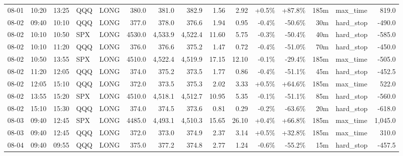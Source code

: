 \documentclass[11pt,a4paper,twoside]{article}
\begin{document}
\begin{landscape}
\begin{center}
\begin{longtable}{>{\color{txtmain}}l l l l l r r r r r r r r >{\color{txtmain}}l r}
08-01 & 10:20 & 13:25 & QQQ & LONG & 380.0 & 381.0 & 382.9 & 1.56 & 2.92 & \textcolor{wingreen}{+0.5\%} & \textcolor{wingreen}{+87.8\%} & 185m & max\_time & \textcolor{wingreen}{819.0} \\
08-02 & 09:40 & 10:10 & QQQ & LONG & 377.0 & 378.0 & 376.6 & 1.94 & 0.95 & \textcolor{lossred}{-0.4\%} & \textcolor{lossred}{-50.6\%} & 30m & hard\_stop & \textcolor{lossred}{-490.0} \\
08-02 & 10:10 & 10:50 & SPX & LONG & 4530.0 & 4,533.9 & 4,522.4 & 11.60 & 5.75 & \textcolor{lossred}{-0.3\%} & \textcolor{lossred}{-50.4\%} & 40m & hard\_stop & \textcolor{lossred}{-585.0} \\
08-02 & 10:10 & 11:20 & QQQ & LONG & 376.0 & 376.6 & 375.2 & 1.47 & 0.72 & \textcolor{lossred}{-0.4\%} & \textcolor{lossred}{-51.0\%} & 70m & hard\_stop & \textcolor{lossred}{-450.0} \\
08-02 & 10:50 & 13:55 & SPX & LONG & 4510.0 & 4,522.4 & 4,519.9 & 17.15 & 12.10 & \textcolor{lossred}{-0.1\%} & \textcolor{lossred}{-29.4\%} & 185m & max\_time & \textcolor{lossred}{-505.0} \\
08-02 & 11:20 & 12:05 & QQQ & LONG & 374.0 & 375.2 & 373.5 & 1.77 & 0.86 & \textcolor{lossred}{-0.4\%} & \textcolor{lossred}{-51.1\%} & 45m & hard\_stop & \textcolor{lossred}{-452.5} \\
08-02 & 12:05 & 15:10 & QQQ & LONG & 372.0 & 373.5 & 375.3 & 2.02 & 3.33 & \textcolor{wingreen}{+0.5\%} & \textcolor{wingreen}{+64.6\%} & 185m & max\_time & \textcolor{wingreen}{522.0} \\
08-02 & 13:55 & 15:20 & SPX & LONG & 4510.0 & 4,518.1 & 4,512.7 & 10.95 & 5.35 & \textcolor{lossred}{-0.1\%} & \textcolor{lossred}{-51.1\%} & 85m & hard\_stop & \textcolor{lossred}{-560.0} \\
08-02 & 15:10 & 15:30 & QQQ & LONG & 374.0 & 374.5 & 373.6 & 0.81 & 0.29 & \textcolor{lossred}{-0.2\%} & \textcolor{lossred}{-63.6\%} & 20m & hard\_stop & \textcolor{lossred}{-618.0} \\
08-03 & 09:40 & 12:45 & SPX & LONG & 4485.0 & 4,493.1 & 4,510.3 & 15.65 & 26.10 & \textcolor{wingreen}{+0.4\%} & \textcolor{wingreen}{+66.8\%} & 185m & max\_time & \textcolor{wingreen}{1,045.0} \\
08-03 & 09:40 & 12:45 & QQQ & LONG & 372.0 & 373.0 & 374.9 & 2.37 & 3.14 & \textcolor{wingreen}{+0.5\%} & \textcolor{wingreen}{+32.8\%} & 185m & max\_time & \textcolor{wingreen}{310.0} \\
08-04 & 09:40 & 09:55 & QQQ & LONG & 375.0 & 377.2 & 374.8 & 2.77 & 1.24 & \textcolor{lossred}{-0.6\%} & \textcolor{lossred}{-55.2\%} & 15m & hard\_stop & \textcolor{lossred}{-457.5} \\

\end{longtable}
\end{center}
\end{landscape}
\end{document}
